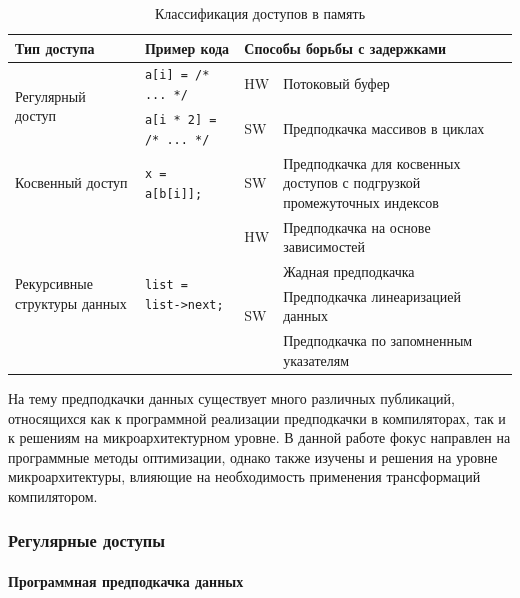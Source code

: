\documentclass[12pt,a4paper,oneside]{article}
\begin{document}
\begin{table}[h]
  \begin{center}
    \begin{tabular}{|| m{4cm} | l | l | m{5.5cm} ||}
      \hline
      Тип доступа & Пример кода & \multicolumn{2}{|l|}{Способы борьбы с задержками} \\
      \hline\hline
      \multirow{2}{4cm}{Регулярный доступ} & \texttt{a[i] = /* ... */} & HW & Потоковый буфер \\ \cline{3-4}
                  &  \texttt{a[i * 2] = /* ... */} & SW & Предподкачка массивов в циклах \\
      \hline
      Косвенный доступ & \texttt{x = a[b[i]];} & SW & Предподкачка для косвенных доступов с подгрузкой промежуточных индексов \\
      \hline
      \multirow{4}{4cm}{Рекурсивные структуры данных} & \multirow{4}{*}{\texttt{list = list->next;}} & HW & Предподкачка на основе зависимостей \\ \cline{3-4}
                  & & \multirow{3}{*}{SW} & Жадная предподкачка \\
                  & & & Предподкачка линеаризацией данных \\
                  & & & Предподкачка по запомненным указателям \\
      \hline
    \end{tabular}
    \caption{Классификация доступов в память}
    \label{tab:classify}
  \end{center}
\end{table}

На тему предподкачки данных существует много различных публикаций, относящихся как к программной реализации предподкачки в компиляторах, так и к решениям на микроархитектурном уровне. В данной работе фокус направлен на программные методы оптимизации, однако также изучены и решения на уровне микроархитектуры, влияющие на необходимость применения трансформаций компилятором.

\subsubsection{Регулярные доступы}

\paragraph{Программная предподкачка данных}
\end{document}

